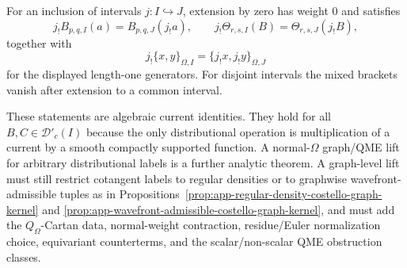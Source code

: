 \begin{thm}
  For an inclusion of intervals \(j:I\hookrightarrow J\), extension by zero
  has weight \(0\) and satisfies
  \[
    j_!B_{p,q,I}(a)=B_{p,q,J}(j_!a),\qquad
    j_!\Theta_{r,s,I}(B)=\Theta_{r,s,J}(j_!B),
  \]
  together with
  \[
    j_!\{x,y\}_{\Omega,I}
      =
    \{j_!x,j_!y\}_{\Omega,J}
  \]
  for the displayed length-one generators.  For disjoint intervals the
  mixed brackets vanish after extension to a common interval.

  These statements are algebraic current identities.  They hold for all
  \(B,C\in\mathcal D'_c(I)\) because the only distributional operation is
  multiplication of a current by a smooth compactly supported function.
  A normal-\(\Omega\) graph/QME lift for arbitrary distributional labels is
  a further analytic theorem.  A graph-level lift must still restrict
  cotangent labels to regular densities or to graphwise
  wavefront-admissible tuples as in
  Propositions~\ref{prop:app-regular-density-costello-graph-kernel} and
  \ref{prop:app-wavefront-admissible-costello-graph-kernel}, and must add
  the \(Q_\Omega\)-Cartan data, normal-weight contraction,
  residue/Euler normalization choice, equivariant counterterms, and the
  scalar/non-scalar QME obstruction classes.
\end{thm}

